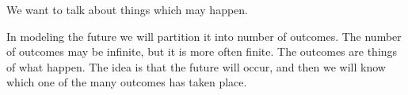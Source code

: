 

We want to talk about
things which may happen.


In modeling the future we will partition it
into number of outcomes. The number of outcomes
may be infinite, but it is more often finite.
The outcomes are things of what happen. The idea
is that the future will occur, and then we will
know which one of the many outcomes has taken place.
